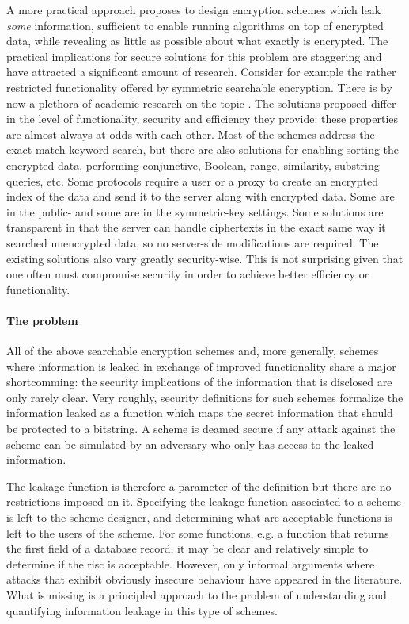 A more practical approach proposes to design encryption schemes which leak \emph{some} information, sufficient to enable running algorithms on top of encrypted data, while revealing as little as possible about what exactly is encrypted. 
The practical implications for secure solutions for this problem are staggering and have attracted a significant amount of research.
Consider for example  the rather restricted functionality offered by symmetric searchable encryption.
There is by now a plethora of academic research on the topic \cite{}. 
The solutions proposed differ in the level of functionality, security and efficiency they provide: 
these properties are almost always at odds with each other. 
Most of the schemes address the exact-match keyword search, but there are also solutions for enabling
sorting the encrypted data, performing conjunctive, Boolean, range, similarity, substring queries, etc. Some
protocols require a user or a proxy to create an encrypted index of the data and send it to the server along
with encrypted data. Some are in the public- and some are in the symmetric-key settings. Some solutions
are transparent in that the server can handle ciphertexts in the exact same way it searched unencrypted data,
so no server-side modifications are required. The existing solutions also vary greatly security-wise. This
is not surprising given that one often must compromise security in order to achieve better efficiency or
functionality. 

\paragraph{The problem}
All of the above searchable encryption schemes and, more generally, schemes where information is leaked in exchange of improved functionality share a major shortcomming: the security implications of the information that is disclosed are only rarely clear. 
Very roughly, security definitions for such schemes formalize the information leaked as  a function which maps the secret information that should be protected to a bitstring.  A scheme is deamed secure if any attack against the scheme can be simulated by an adversary who only has access to the leaked information.

The leakage function is therefore a parameter of the definition but there are no restrictions imposed on it. 
Specifying the leakage function associated to a scheme is left to the scheme designer, and determining what are acceptable functions is left to the users of the scheme.
For some functions, e.g. a function that returns the first field of a database record, it may be clear and relatively simple to determine if the risc is acceptable.
However, only informal arguments where attacks that exhibit obviously insecure behaviour have appeared in the literature. 
What is missing is a principled approach to the problem of understanding and quantifying information leakage in this type of schemes. 

